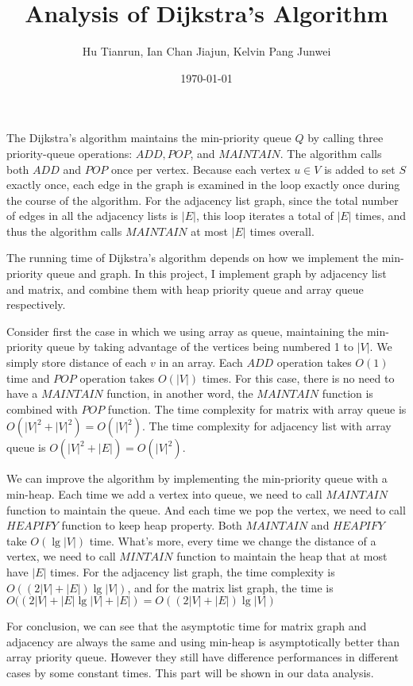 \documentclass{article}
\title{Analysis of Dijkstra's Algorithm}
\author{Hu Tianrun, Ian Chan Jiajun, Kelvin Pang Junwei}
\date{\today}
\begin{document}
	\maketitle
	The Dijkstra's algorithm maintains the min-priority queue $ Q $ by calling three priority-queue operations: $ ADD, POP $, and $ MAINTAIN $. The algorithm calls both $ ADD $ and $ POP $ once per vertex. Because each vertex $ u \in V $ is added to set $ S $ exactly once, each edge in the graph is examined in the loop exactly once during the course of the algorithm. For the adjacency list graph, since the total number of edges in all the adjacency lists is $ |E| $, this loop iterates a total of $ |E| $ times, and thus the algorithm calls $ MAINTAIN $ at most $ |E| $ times overall.
	
	The running time of Dijkstra's algorithm depends on how we implement the min-priority queue and graph. In this project, I implement graph by adjacency list and matrix, and combine them with heap priority queue and array queue respectively.
	
	Consider first the case in which we using array as queue, maintaining the min-priority queue by taking advantage of the vertices being numbered 1 to $ |V| $. We simply store distance of each $ v $ in an array. Each $ ADD $ operation takes $ O(1) $ time and $ POP $ operation takes $ O(|V|) $ times. For this case, there is no need to have a $ MAINTAIN $ function, in another word, the $ MAINTAIN $ function is combined with $ POP $ function. The time complexity for matrix with array queue is $ O(|V|^2 + |V|^2) = O(|V|^2) $. The time complexity for adjacency list with array queue is $ O(|V|^2 + |E|) = O(|V|^2) $. 
	
	We can improve the algorithm by implementing the min-priority queue with a min-heap. Each time we add a vertex into queue, we need to call $ MAINTAIN $ function to maintain the queue. And each time we pop the vertex, we need to call $ HEAPIFY $ function to keep heap property. Both $ MAINTAIN $ and $ HEAPIFY $ take $ O(\lg |V|) $ time. What's more, every time we change the distance of a vertex, we need to call $ MINTAIN $ function to maintain the heap that at most have $ |E| $ times. For the adjacency list graph, the time complexity is $ O((2|V|+|E|)\lg |V|) $, and for the matrix list graph, the time is $ O((2|V|+|E|\lg |V| + |E|) = O((2|V|+|E|)\lg |V|) $
	
	For conclusion, we can see that the asymptotic time for matrix graph and adjacency are always the same and using min-heap is asymptotically better than array priority queue. However they still have difference performances in different cases by some constant times. This part will be shown in our data analysis.
	
	
\end{document}
